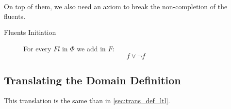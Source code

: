 On top of them, we also need an axiom to break the non-completion of the fluents.

\begin{description}
  \item[Fluents Initiation]
  For every $Fl$ in $\Phi$ we add in $F$:
  \begin{equation}\tag{$A.3$}
    f \lor \neg f
  \end{equation}
\end{description}

\subsection{Translating the Domain Definition}

This translation is the same than in \ref{sec:trans_def_ltl}.

